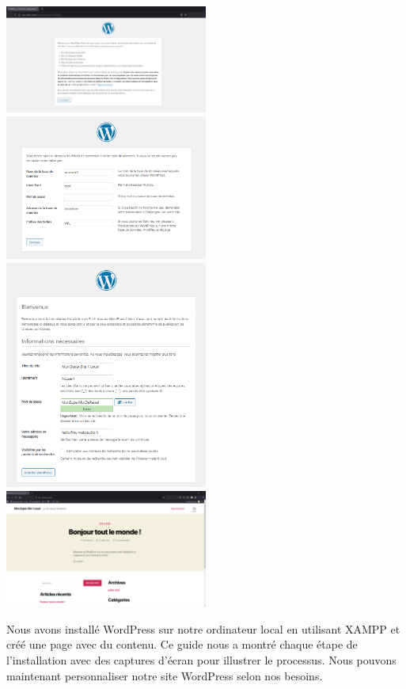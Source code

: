 \documentclass[a4paper,11pt]{article}
\begin{document}
                \includegraphics[width=0.5\textwidth]{CHAPITRE-4/4.2-A-RENDRE/screen1.png}
                \includegraphics[width=0.5\textwidth]{CHAPITRE-4/4.2-A-RENDRE/screen2.png}
                \includegraphics[width=0.5\textwidth]{CHAPITRE-4/4.2-A-RENDRE/screen3.png}
                \includegraphics[width=0.5\textwidth]{CHAPITRE-4/4.2-A-RENDRE/screen4.png}

                \bigskip
                \begin{tcolorbox}[colback=lightgray!6, colframe=black, left=5mm, right=5mm, top=2mm, bottom=2mm, boxrule=0.1mm]
                    Nous avons installé WordPress sur notre ordinateur local en utilisant XAMPP et créé une page avec du contenu. Ce guide nous a montré chaque étape de l'installation avec des captures d'écran pour illustrer le processus. 
                    Nous pouvons maintenant personnaliser notre site WordPress selon nos besoins.
                \end{tcolorbox}
            
\end{document}
